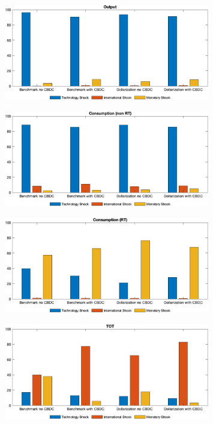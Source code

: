 \documentclass[12pt]{article}
\begin{document}
\begin{figure}[h!]
\includegraphics[width=0.8\textwidth]{log_y}
\end{figure}

\begin{figure}[h!]
\includegraphics[width=0.8\textwidth]{log_c1}
\end{figure}

\begin{figure}[h!]
\includegraphics[width=0.8\textwidth]{log_c2}
\end{figure}

\begin{figure}[h!]
\includegraphics[width=0.8\textwidth]{log_tot}
\end{figure}
\end{document}
